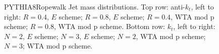 \begin{figure}[H]
\hfill
{}\hfill
\caption{PYTHIA8Ropewalk Jet mass distributions. Top row: anti-$k_t$, left to right: $R=0.4$, $E$ scheme; $R=0.8$, $E$ scheme; $R=0.4$, WTA mod p scheme; $R=0.8$, WTA mod p scheme. Bottom row: $k_t$, left to right: $N=2$, $E$ scheme; $N=3$, $E$ scheme; $N=2$, WTA mod p scheme; $N=3$; WTA mod p scheme.}  
\end{figure}

